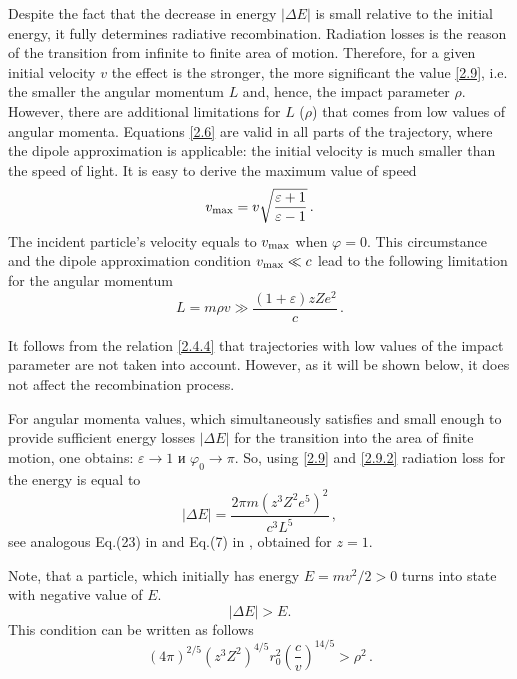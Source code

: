 \documentclass{SovJurn/JETPL}
\begin{document}
Despite the fact that the decrease in energy $|\Delta E|$ is small relative to the initial energy, it fully determines radiative recombination. Radiation losses is the reason of the transition from infinite to finite area of motion. Therefore, for a given initial velocity $v$ the effect is the stronger, the more significant the value \eqref {2.9}, i.e. the smaller the angular momentum $L$ and, hence, the impact parameter $\rho $. However, there are additional limitations for $L$ ($\rho$) that comes from low values of angular momenta. Equations \eqref{2.6} are valid in all parts of the trajectory, where the dipole approximation is applicable: the initial velocity is much smaller than the speed of light. It is easy to derive the maximum value of speed
\begin{equation}
v_{\rm max}=v\sqrt{\frac{\varepsilon+1}{\varepsilon-1}}\,.
\label{vmax}
\end{equation}
The incident particle's velocity equals to $v_{\rm max}$ when $\varphi=0$. This circumstance and the dipole approximation condition $v_{\rm max}\ll c$ lead to the following limitation for the angular momentum
\begin{equation}
L=m\rho v\gg\frac{(1+\varepsilon)zZe^2}{c}\,.
\label{2.4.4}
\end{equation}
\par It follows from the relation \eqref{2.4.4} that trajectories with low values of the impact parameter are not taken into account. However, as it will be shown below, it does not affect the recombination process.
\par For angular momenta values, which simultaneously satisfies \label{2.4.4} and small enough to provide sufficient energy losses $|\Delta E|$ for the transition into the area of finite motion, one obtains: $\varepsilon\to 1$ и $\varphi_0\to \pi$. So, using \eqref{2.9} and \eqref{2.9.2} radiation loss for the energy is equal to
\begin{equation}
\label{EnergyLossFromLL}
|\Delta E|=\frac{2\pi m(z^3Z^2e^5)^2}{c^3L^5}\,,
\end{equation}
see analogous Eq.(23) in \cite{kramers1923xciii} and Eq.(7) in \cite{elutin}, obtained for $z=1$.
\par Note, that a particle, which initially has energy $E=mv^2/2>0$ turns into state with negative value of $E$. 
\begin{equation}
\label{2.11.1}
|\Delta E|>E.
\end{equation}
This condition can be written as follows 
\begin{equation}
\label{2.11.2}
(4\pi)^{2/5}(z^3Z^2)^{4/5}r_0^2\left(\frac{c}{v}\right)^{14/5}>\rho^2\,.
\end{equation}
\end{document}
